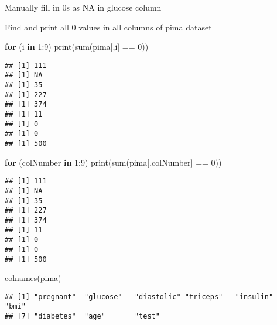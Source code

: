 \documentclass[
]{article}
\newenvironment{Shaded}{\begin{snugshade}}{\end{snugshade}}
\newcommand{\ConstantTok}[1]{\textcolor[rgb]{0.00,0.00,0.00}{#1}}
\newcommand{\ControlFlowTok}[1]{\textcolor[rgb]{0.13,0.29,0.53}{\textbf{#1}}}
\newcommand{\DecValTok}[1]{\textcolor[rgb]{0.00,0.00,0.81}{#1}}
\newcommand{\FunctionTok}[1]{\textcolor[rgb]{0.00,0.00,0.00}{#1}}
\newcommand{\NormalTok}[1]{#1}
\newcommand{\OtherTok}[1]{\textcolor[rgb]{0.56,0.35,0.01}{#1}}
\newcommand{\SpecialCharTok}[1]{\textcolor[rgb]{0.00,0.00,0.00}{#1}}
\begin{document}
Manually fill in 0s as NA in glucose column

\begin{Shaded}
\end{Shaded}

Find and print all 0 values in all columns of pima dataset

\begin{Shaded}
\begin{Highlighting}[]
\ControlFlowTok{for}\NormalTok{ (i }\ControlFlowTok{in} \DecValTok{1}\SpecialCharTok{:}\DecValTok{9}\NormalTok{) }\FunctionTok{print}\NormalTok{(}\FunctionTok{sum}\NormalTok{(pima[,i] }\SpecialCharTok{==} \DecValTok{0}\NormalTok{))}
\end{Highlighting}
\end{Shaded}

\begin{verbatim}
## [1] 111
## [1] NA
## [1] 35
## [1] 227
## [1] 374
## [1] 11
## [1] 0
## [1] 0
## [1] 500
\end{verbatim}

\begin{Shaded}
\begin{Highlighting}[]
\ControlFlowTok{for}\NormalTok{ (colNumber }\ControlFlowTok{in} \DecValTok{1}\SpecialCharTok{:}\DecValTok{9}\NormalTok{) }\FunctionTok{print}\NormalTok{(}\FunctionTok{sum}\NormalTok{(pima[,colNumber] }\SpecialCharTok{==} \DecValTok{0}\NormalTok{))}
\end{Highlighting}
\end{Shaded}

\begin{verbatim}
## [1] 111
## [1] NA
## [1] 35
## [1] 227
## [1] 374
## [1] 11
## [1] 0
## [1] 0
## [1] 500
\end{verbatim}

\begin{Shaded}
\begin{Highlighting}[]
\FunctionTok{colnames}\NormalTok{(pima)}
\end{Highlighting}
\end{Shaded}

\begin{verbatim}
## [1] "pregnant"  "glucose"   "diastolic" "triceps"   "insulin"   "bmi"      
## [7] "diabetes"  "age"       "test"
\end{verbatim}
\end{document}

